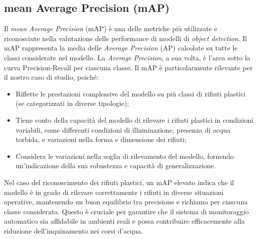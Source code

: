 \subsection*{mean Average Precision (mAP)}

Il \textit{mean Average Precision} (mAP) è una delle metriche più utilizzate e riconosciute nella valutazione delle performance di modelli di \textit{object detection}. Il mAP rappresenta la media delle \textit{Average Precision} (AP) calcolate su tutte le classi considerate nel modello. La \textit{Average Precision}, a sua volta, è l'area sotto la curva Precision-Recall per ciascuna classe. Il mAP è particolarmente rilevante per il nostro caso di studio, poiché:

\begin{itemize}
    \item Riflette le prestazioni complessive del modello su più classi di rifiuti plastici (se categorizzati in diverse tipologie);
    \item Tiene conto della capacità del modello di rilevare i rifiuti plastici in condizioni variabili, come differenti condizioni di illuminazione, presenza di acqua torbida, e variazioni nella forma e dimensione dei rifiuti;
    \item Considera le variazioni nella soglia di rilevamento del modello, fornendo un'indicazione della sua robustezza e capacità di generalizzazione.
\end{itemize}

Nel caso del riconoscimento dei rifiuti plastici, un mAP elevato indica che il modello è in grado di rilevare correttamente i rifiuti in diverse situazioni operative, mantenendo un buon equilibrio tra precisione e richiamo per ciascuna classe considerata. Questo è cruciale per garantire che il sistema di monitoraggio automatico sia affidabile in ambienti reali e possa contribuire efficacemente alla riduzione dell'inquinamento nei corsi d'acqua.